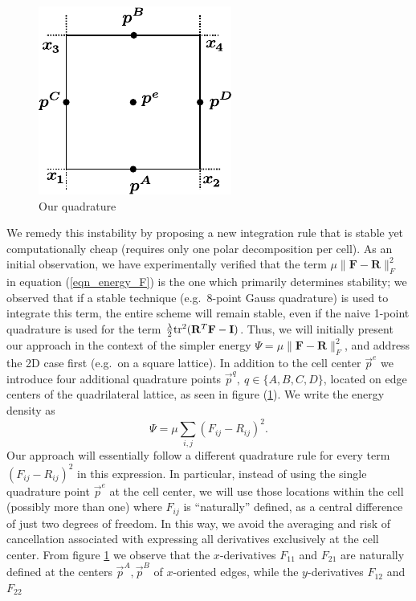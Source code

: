 \begin{figure}[th]
\centering
\includegraphics[width=.3\columnwidth]{elasticity/figures/quadrature}
\caption{Our quadrature}
\label{fig_quadrature}
\end{figure}
We remedy this instability by proposing a new integration rule that is
stable yet computationally cheap (requires only one polar decomposition per cell). As an initial observation, we have experimentally verified that the term $\mu\|\mathbf{F}-\mathbf{R}\|_F^2$ in equation (\ref{eqn_energy_F}) is
the one which primarily determines stability; we observed that if a stable technique (e.g.\ 8-point Gauss quadrature) is used to integrate this term, the entire scheme will remain
stable, even if the naive 1-point quadrature is used for the term  $\frac{\lambda}{2}\mbox{tr}^2(\mathbf{R}^T\mathbf{F}-\mathbf{I})$. Thus, we will initially present our approach in the context
of the simpler energy $\Psi=\mu\|\mathbf{F}-\mathbf{R}\|_F^2$, and address the 2D case first (e.g.\ on a square lattice). In addition to the cell center $\vec{p}^e$ we introduce four
additional quadrature points $\vec{p}^q,\ q\in\{A,B,C,D\}$, located on
edge centers of the quadrilateral lattice, as seen in figure
(\ref{fig_quadrature}). We write the energy density as
\begin{equation}
\Psi=\mu\sum_{i,j}
  (F_{ij}-R_{ij})^2.
\label{eqn_energy_only_mu}
\end{equation}
Our approach will essentially follow a different quadrature rule for every term $(F_{ij}-R_{ij})^2$ in this expression. In particular, instead of using the single quadrature point
$\vec{p}^e$ at the cell center, we will use those locations within the cell (possibly more than one) where $F_{ij}$ is ``naturally'' defined, as a central difference of just two degrees
of freedom. In this way, we avoid the averaging and risk of cancellation associated with expressing all derivatives exclusively at the cell center. From figure \ref{fig_quadrature} we
observe that the $x$-derivatives $F_{11}$ and $F_{21}$ are naturally defined at the centers $\vec{p}^A,\vec{p}^B$ of $x$-oriented edges, while the $y$-derivatives $F_{12}$ and $F_{22}$
